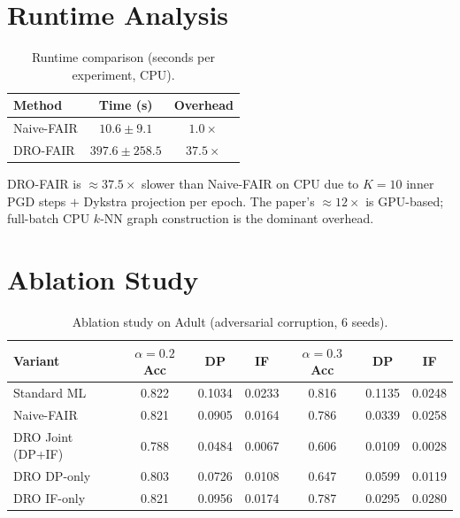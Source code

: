 \documentclass[11pt,a4paper]{article}
\begin{document}
\section{Runtime Analysis}

\begin{table}[H]
\centering\small
\caption{Runtime comparison (seconds per experiment, CPU).}
\label{tab:runtime}
\begin{tabular}{lcc}
\toprule
\rowcolor{hdrblue!90}
\color{white}\textbf{Method} & \color{white}\textbf{Time (s)} & \color{white}\textbf{Overhead} \\
\midrule
Naive-FAIR & $10.6 \pm 9.1$ & $1.0\times$ \\
DRO-FAIR   & $397.6 \pm 258.5$ & $37.5\times$ \\
\bottomrule
\end{tabular}
\end{table}

DRO-FAIR is $\approx37.5\times$ slower than Naive-FAIR on CPU due to $K=10$
inner PGD steps $+$ Dykstra projection per epoch.  The paper's
$\approx12\times$ is GPU-based; full-batch CPU $k$-NN graph construction is
the dominant overhead.

\section{Ablation Study}

\begin{table}[H]
\centering\small
\caption{Ablation study on Adult (adversarial corruption, 6 seeds).}
\label{tab:ablation}
\begin{tabular}{L{4cm}cccccc}
\toprule
{}
\color{white}\textbf{Variant} & \color{white}\(\alpha{=}0.2\) Acc & \color{white}DP & \color{white}IF & \color{white}\(\alpha{=}0.3\) Acc & \color{white}DP & \color{white}IF \\
\midrule
Standard ML       & 0.822 & 0.1034 & 0.0233 & 0.816 & 0.1135 & 0.0248 \\
Naive-FAIR        & 0.821 & 0.0905 & 0.0164 & 0.786 & 0.0339 & 0.0258 \\
DRO Joint (DP+IF) & 0.788 & 0.0484 & 0.0067 & 0.606 & 0.0109 & 0.0028 \\
DRO DP-only       & 0.803 & 0.0726 & 0.0108 & 0.647 & 0.0599 & 0.0119 \\
DRO IF-only       & 0.821 & 0.0956 & 0.0174 & 0.787 & 0.0295 & 0.0280 \\
\bottomrule
\end{tabular}
\end{table}
\end{document}
